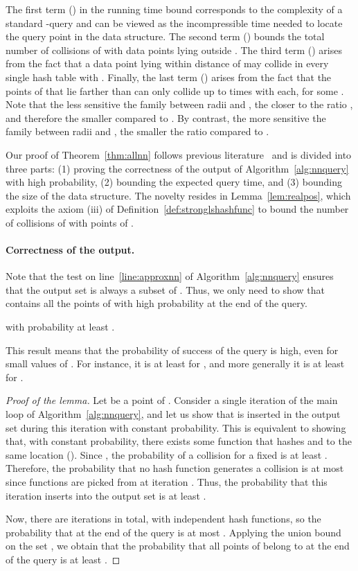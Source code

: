 The first term () in the
running time bound corresponds to the complexity of a standard
-\pleb query and can be viewed as the incompressible time
needed to locate the query point  in the data structure. The second
term () bounds the total number of collisions
of  with data points lying outside .  The third
term () arises from the
fact that a data point lying within distance  of  may
collide in every single hash table with . Finally, the last term
()
arises from the fact that the points of  that
lie farther than  can only collide up to 
times with  each, for some . Note that the less
sensitive the family  between radii  and , the closer to
 the ratio , and therefore the smaller
 compared to . By contrast, the more sensitive the
family between radii  and , the smaller the ratio
 compared to .

Our proof of Theorem~\ref{thm:allnn} follows previous
literature~\cite{HarPeledIndykMotwani} and is divided into three
parts: (1) proving the correctness of the output of
Algorithm~\ref{alg:nnquery} with high probability, (2) bounding the
expected query time, and (3) bounding the size of the data
structure. The novelty resides in Lemma~\ref{lem:realpos}, which
exploits the axiom (iii) of Definition~\ref{def:stronglshashfunc} to
bound the number of collisions of  with points of
.

\paragraph{Correctness of the output.}
\label{sec:A_correct}
Note that the test on line~\ref{line:approxnn} of
Algorithm~\ref{alg:nnquery} ensures that the output set  is
always a subset of . Thus, we only need to show that
 contains all the points of  with high probability
at the end of the query.
\begin{lem} \label{lem:success}
 with probability at least
  . 
\end{lem}
This result means that the probability of success of the query is
high, even for small values of . For instance, it is at least
 for , and more
generally it is at least  for .
\begin{proof}[Proof of the lemma]
  Let  be a point of . Consider a single iteration
   of the main loop of Algorithm~\ref{alg:nnquery}, and let us show
  that  is inserted in the output set  during this iteration
  with constant probability.  This is equivalent to showing that, with
  constant probability, there exists some function  that
  hashes  and  to the same location (). Since
  , the probability of a collision for a fixed  is at
  least . Therefore, the
  probability that no hash function  generates a collision is at
  most  since  functions are picked from 
  at iteration . Thus, the probability that this iteration inserts
   into the output set  is at least
  .

Now, there are  iterations in total, with
independent hash functions, so the probability that  at the
end of the query is at most . Applying the union bound on the set
, we obtain that the probability that all points of
 belong to  at the end of the query is at least
.
\end{proof}

